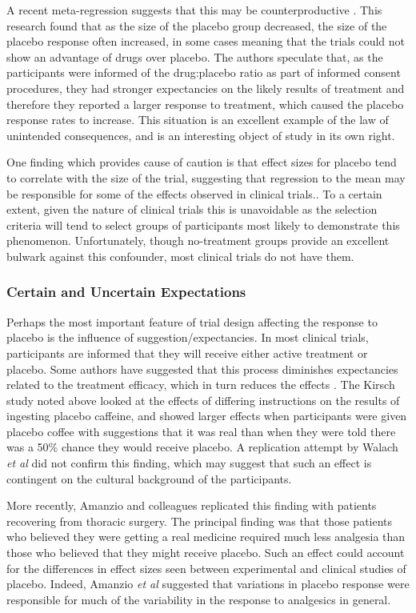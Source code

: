 A recent meta-regression suggests that this may be counterproductive \cite{Papakostas2009}.  This research found that as the size of the placebo group decreased, the size of the placebo response often increased, in some cases meaning that the trials could not show an advantage of drugs over placebo. The authors speculate that, as the participants were informed of the drug:placebo ratio as part of informed consent procedures, they had stronger expectancies on the likely results of treatment and therefore they reported a larger response to treatment, which caused the placebo response rates to increase. This situation is an excellent example of the law of unintended consequences, and is an interesting object of study in its own right. 

One finding which provides cause of caution is that effect sizes for placebo tend to correlate with the size of the trial, suggesting that regression to the mean may be responsible for some of the effects observed in clinical trials.\cite{Enck2005a}. To a certain extent, given the nature of clinical trials this is unavoidable as the selection criteria will tend to select groups of participants most likely to demonstrate this phenomenon. Unfortunately, though no-treatment groups provide an excellent bulwark against this confounder, most clinical trials do not have them. 


\subsubsection{Certain and Uncertain Expectations}
\label{sec:cert-uncert-expect}
Perhaps the most important feature of trial design affecting the response to placebo  is the influence of suggestion/expectancies. In most clinical trials, participants are informed that they will receive either active treatment or placebo. Some authors have suggested \cite{kirsch1988double}  that this process diminishes expectancies related to the treatment efficacy, which in turn reduces the effects \cite{Kleijnen1994}. The Kirsch study noted above looked at the effects of differing instructions on the results of ingesting placebo caffeine, and showed larger effects when participants were given placebo coffee with suggestions that it was real than when they were told there was a 50\% chance they would receive placebo. A replication attempt by Walach \textit{et al} did not confirm this finding, which may suggest that such an effect is contingent on the cultural background of the participants. 

More recently,  Amanzio and colleagues \cite{Amanzio2001} replicated this finding with patients recovering from thoracic surgery. The principal finding was that those patients who believed they were getting a real medicine required much less analgesia than those who believed that they might receive placebo. Such an effect could account for the differences in effect sizes seen between experimental and clinical studies of placebo. Indeed, Amanzio \textit{et al } suggested that variations in placebo response were responsible for much of the variability in the response to analgesics in general.

